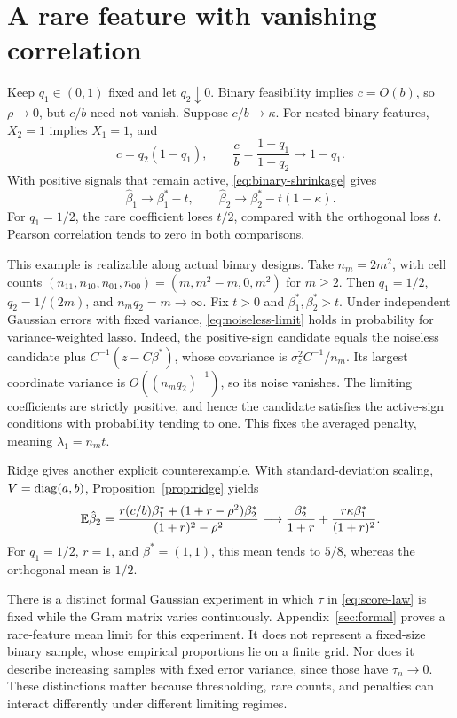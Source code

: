 \section{A rare feature with vanishing correlation}

Keep $q_1 \in (0,1)$ fixed and let $q_2 \downarrow 0$. Binary feasibility
implies $c = O(b)$, so $\rho \to 0$, but $c/b$ need not vanish. Suppose
$c/b \to \kappa$. For nested binary features, $X_2 = 1$ implies $X_1 = 1$, and
\begin{equation}
 \label{eq:nested}
 c = q_2(1 - q_1),\qquad \frac cb
   = \frac{1 - q_1}{1 - q_2}
   \longrightarrow 1 - q_1.
\end{equation}
With positive signals that remain active, \eqref{eq:binary-shrinkage} gives
\begin{equation}
 \label{eq:noiseless-limit}
 \hat\beta_1 \longrightarrow \beta_1^* - t,\qquad \hat\beta_2
             \longrightarrow \beta_2^* - t(1 - \kappa).
\end{equation}
For $q_1 = 1/2$, the rare coefficient loses $t/2$, compared with the orthogonal
loss $t$. Pearson correlation tends to zero in both comparisons.

This example is realizable along actual binary designs. Take $n_m = 2m^2$, with
cell counts $(n_{11},n_{10},n_{01},n_{00}) = (m,m^2 - m,0,m^2)$ for $m \ge 2$.
Then $q_1 = 1/2$, $q_2 = 1/(2m)$, and $n_mq_2 = m \to \infty$. Fix $t > 0$ and
$\beta_1^*,\beta_2^* > t$. Under independent Gaussian errors with fixed
variance, \eqref{eq:noiseless-limit} holds in probability for variance-weighted
lasso. Indeed, the positive-sign candidate equals the noiseless candidate plus
$C^{-1}(z - C\beta^*)$, whose covariance is $\sigma_\varepsilon^2 C^{-1}/n_m$.
Its largest coordinate variance is $O((n_mq_2)^{-1})$, so its noise vanishes.
The limiting coefficients are strictly positive, and hence the candidate
satisfies the active-sign conditions with probability tending to one. This fixes
the averaged penalty, meaning $\lambda_1 = n_mt$.

Ridge gives another explicit counterexample. With standard-deviation scaling,
$V = \operatorname{diag}(a,b)$, Proposition~\ref{prop:ridge} yields
\[
 \mathbb{E}\hat\beta_2 = \frac{r(c/b)\beta_1^* + (1 + r - \rho^2)\beta_2^*}{(1 + r)^2 - \rho^2}
               \longrightarrow \frac{\beta_2^*}{1 + r}
                               + \frac{r\kappa\beta_1^*}{(1 + r)^2}.
\]
For $q_1 = 1/2$, $r = 1$, and $\beta^* = (1,1)$, this mean tends to $5/8$,
whereas the orthogonal mean is $1/2$.

There is a distinct formal Gaussian experiment in which $\tau$ in
\eqref{eq:score-law} is fixed while the Gram matrix varies continuously.
Appendix~\ref{sec:formal} proves a rare-feature mean limit for this experiment.
It does not represent a fixed-size binary sample, whose empirical proportions
lie on a finite grid. Nor does it describe increasing samples with fixed error
variance, since those have $\tau_n \to 0$. These distinctions matter because
thresholding, rare counts, and penalties can interact differently under
different limiting regimes.
